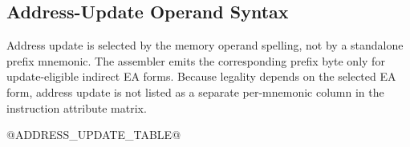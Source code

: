 \subsection{Address-Update Operand Syntax}
Address update is selected by the memory operand spelling, not by a standalone prefix mnemonic. The assembler
emits the corresponding prefix byte only for update-eligible indirect EA forms. Because legality depends on the
selected EA form, address update is not listed as a separate per-mnemonic column in the instruction attribute
matrix.

@ADDRESS_UPDATE_TABLE@
